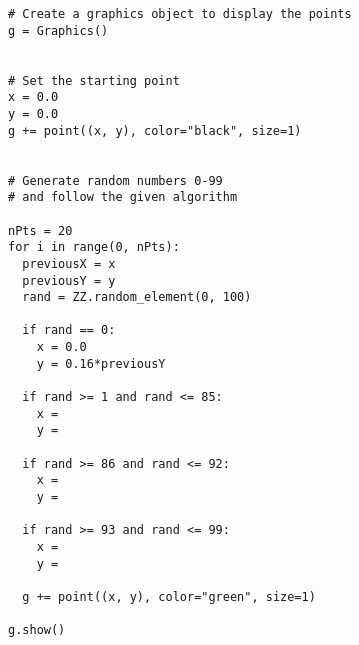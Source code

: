 \begin{verbatim}
# Create a graphics object to display the points
g = Graphics()


# Set the starting point
x = 0.0 
y = 0.0 
g += point((x, y), color="black", size=1)


# Generate random numbers 0-99
# and follow the given algorithm

nPts = 20
for i in range(0, nPts):
  previousX = x 
  previousY = y 
  rand = ZZ.random_element(0, 100)

  if rand == 0:
    x = 0.0 
    y = 0.16*previousY

  if rand >= 1 and rand <= 85: 
    x =
    y =

  if rand >= 86 and rand <= 92: 
    x =
    y =

  if rand >= 93 and rand <= 99: 
    x =
    y =

  g += point((x, y), color="green", size=1)

g.show()
\end{verbatim}


\pagebreak \clearpage
